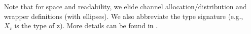 Note that for space and readability, we elide channel allocation/distribution
and wrapper definitions (with ellipses). We also abbreviate the type signature
(e.g., $X_{\mathsf{z}}$ is the type of \textsf{z}). More details can be found in
.

